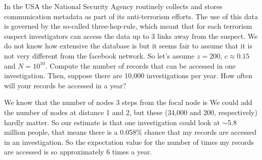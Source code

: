 
In the USA the National Security Agency routinely collects and stores communication metadata as part of its anti-terrorism efforts. The use of this data is governed by the so-called three-hop-rule, which meant that for  each terrorism suspect investigators can access the data up to 3 links away from the suspect. We do not know how extensive the database is but it seems fair to assume that it is not very different from the facebook network. So let's assume $z=200$, $c\approx0.15$ and $N=10^{10}$. Compute the number of records that can be accessed in one investigation. Then, suppose there are 10,000 investigations per year. How often will your records be accessed in a year?

\solution
We know that the number of nodes 3 steps from the focal node is 
We could add the number of nodes at distance 1 and 2, but these 
(34,000 and 200, respectively) hardly matter. So our estimate is that one investigation could look at $\sim$5.8 million people, that means there is a 0.058\% chance that my records are accessed in an investigation. So the expectation value for the number of times my records are accessed is 
so approximately 6 times a year. 
